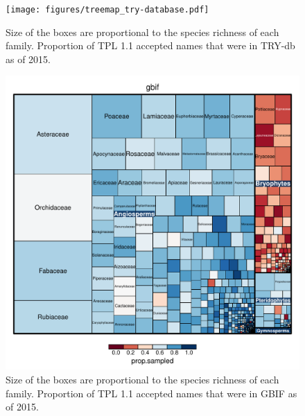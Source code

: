 \documentclass[a4paper,11pt]{article}
\begin{document}
\begin{figure}[h!]
\centering
\texttt{[image: figures/treemap\_try-database.pdf]}
\caption{Size of the boxes are proportional to the species richness of each family.  Proportion of TPL 1.1 accepted names that were in TRY-db as of 2015.  }
\label{fig:try_treemap}
\end{figure}
\clearpage

\begin{figure}[h!]
\centering
\includegraphics[width=\textwidth]{figures/treemap_gbif.pdf}
\caption{Size of the boxes are proportional to the species richness of each family.  Proportion of TPL 1.1 accepted names that were in GBIF as of 2015.  }
\label{fig:gbif_treemap}
\end{figure}
\clearpage
\end{document}

